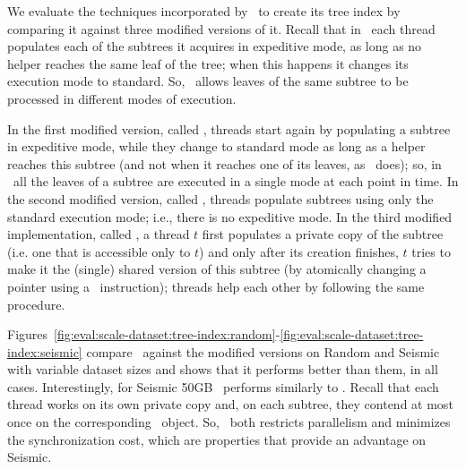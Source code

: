 
We evaluate the techniques incorporated by \Fresh\ to create its
tree index by comparing it against three modified versions of it. 
Recall that in \Fresh\ each thread populates each of the subtrees it
acquires in expeditive mode, as long as no helper reaches the same leaf of the tree;
when this happens it changes its execution mode to standard. 
So, \Fresh\ allows leaves of the same subtree to be processed in different
modes of execution.

In the first modified version, called \FreshSub, threads start again by populating 
a subtree in expeditive mode, while they change to standard mode as long as a helper 
reaches this subtree (and not when it reaches one of its leaves, as \Fresh\ does); 
so, in \FreshSub\ all the leaves of a subtree are executed in a single mode at each 
point in time. 
In the second modified version, called \FreshSTD, threads populate subtrees using only 
the standard execution mode; i.e., there is no expeditive mode.
In the third modified implementation, called \FreshTreeCopy, a thread $t$ first populates a private
copy of the subtree (i.e. one that is accessible only to $t$) and only after its creation finishes,
$t$ tries to make it the (single) shared version of this subtree (by atomically changing a pointer 
using a \CAS\ instruction); threads help each other by following the same procedure.

Figures~\ref{fig:eval:scale-dataset:tree-index:random}-\ref{fig:eval:scale-dataset:tree-index:seismic}
compare \Fresh\ against the modified versions 
on Random and Seismic with variable dataset sizes and shows that it performs better than them,
in all cases. Interestingly, for Seismic 50GB \Fresh\ performs similarly to \FreshTreeCopy.
Recall that each thread works on its own private copy and, on each subtree, they contend at most once 
on the corresponding \CAS\ object. So, \FreshTreeCopy\ both restricts parallelism and minimizes the 
synchronization cost, which are properties that provide an advantage on Seismic. 


